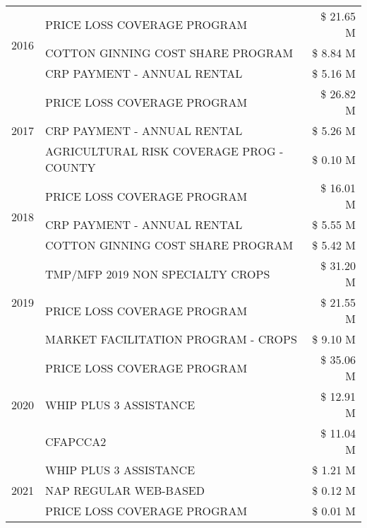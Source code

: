 \begin{tabular}{llr}
\cline{1-3}
\multirow[t]{3}{*}{2016} & PRICE LOSS COVERAGE PROGRAM & \$ 21.65 M \\
 & COTTON GINNING COST SHARE PROGRAM & \$ 8.84 M \\
 & CRP PAYMENT - ANNUAL RENTAL & \$ 5.16 M \\
\cline{1-3}
\multirow[t]{3}{*}{2017} & PRICE LOSS COVERAGE PROGRAM & \$ 26.82 M \\
 & CRP PAYMENT - ANNUAL RENTAL & \$ 5.26 M \\
 & AGRICULTURAL RISK COVERAGE PROG - COUNTY & \$ 0.10 M \\
\cline{1-3}
\multirow[t]{3}{*}{2018} & PRICE LOSS COVERAGE PROGRAM & \$ 16.01 M \\
 & CRP PAYMENT - ANNUAL RENTAL & \$ 5.55 M \\
 & COTTON GINNING COST SHARE PROGRAM & \$ 5.42 M \\
\cline{1-3}
\multirow[t]{3}{*}{2019} & TMP/MFP 2019 NON SPECIALTY CROPS & \$ 31.20 M \\
 & PRICE LOSS COVERAGE PROGRAM & \$ 21.55 M \\
 & MARKET FACILITATION PROGRAM - CROPS & \$ 9.10 M \\
\cline{1-3}
\multirow[t]{3}{*}{2020} & PRICE LOSS COVERAGE PROGRAM & \$ 35.06 M \\
 & WHIP PLUS 3 ASSISTANCE & \$ 12.91 M \\
 & CFAPCCA2 & \$ 11.04 M \\
\cline{1-3}
\multirow[t]{3}{*}{2021} & WHIP PLUS 3 ASSISTANCE & \$ 1.21 M \\
 & NAP REGULAR WEB-BASED & \$ 0.12 M \\
 & PRICE LOSS COVERAGE PROGRAM & \$ 0.01 M \\
\cline{1-3}
\bottomrule
\end{tabular}
